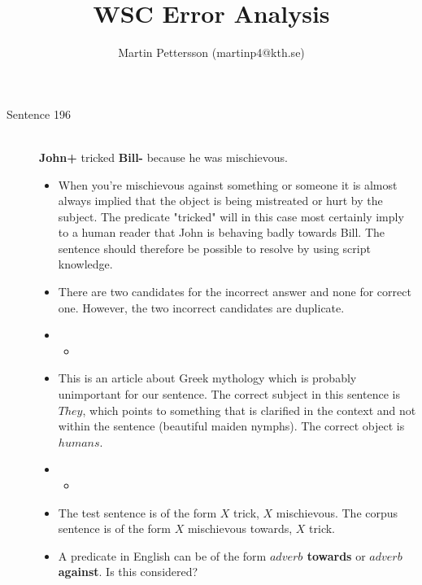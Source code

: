\documentclass{article}
\newcommand{\insertcode}[2]{\begin{itemize}\item[]\end{itemize}} %
\begin{document}
\title{WSC Error Analysis}
\author{Martin Pettersson (martinp4@kth.se)}
\maketitle



\begin{description}


  \item[Sentence 196] \hfill \\
  {\bf John+} tricked {\bf Bill-} because he was mischievous.
  \begin{itemize}
  	\item When you're mischievous against something or someone it is almost always implied that the object is being mistreated or hurt by the subject. The predicate "tricked" will in this case most certainly imply to a human reader that John is behaving badly towards Bill. The sentence should therefore be possible to resolve by using script knowledge.
  	\item There are two candidates for the incorrect answer and none for correct one. However, the two incorrect candidates are duplicate.
  	\item \insertcode{"Scripts/196/196-1.sentence"}{Context for $R_1$ and $R_2$ (duplicates).}
  	\item This is an article about Greek mythology which is probably unimportant for our sentence. The correct subject in this sentence is $They$, which points to something that is clarified in the context and not within the sentence (beautiful maiden nymphs). The correct object is $humans$. 
  	\item \insertcode{"Scripts/196/196-2.sentence"}{Target sentence in $R_1$ and $R_2$.}
  	\item The test sentence is of the form $X$ trick, $X$ mischievous. The corpus sentence is of the form $X$ mischievous towards, $X$ trick.
  	\item A predicate in English can be of the form {\bf $adverb$ towards} or {\bf $adverb$ against}. Is this considered?
  \end{itemize}


\end{description}
\end{document}
